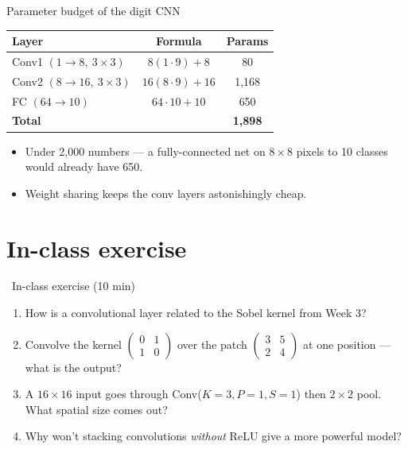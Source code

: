 \documentclass[10pt,aspectratio=169]{beamer}
\begin{document}
\begin{frame}{Parameter budget of the digit CNN}
  \begin{center}
  \begin{tabular}{@{}lcc@{}}
    \toprule
    \textbf{Layer} & \textbf{Formula} & \textbf{Params} \\
    \midrule
    Conv1 $(1{\to}8,\ 3{\times}3)$  & $8(1\cdot9)+8$   & 80 \\
    Conv2 $(8{\to}16,\ 3{\times}3)$ & $16(8\cdot9)+16$ & 1{,}168 \\
    FC $(64{\to}10)$                & $64\cdot10+10$   & 650 \\
    \midrule
    \textbf{Total} & & \textbf{1{,}898} \\
    \bottomrule
  \end{tabular}
  \end{center}
  \begin{itemize}
    \item Under 2{,}000 numbers --- a fully-connected net on $8\times8$ pixels to 10 classes would already have 650.
    \item Weight sharing keeps the conv layers astonishingly cheap.
  \end{itemize}
\end{frame}

\section{In-class exercise}

\begin{frame}{\faPen~In-class exercise (10 min)}
  \begin{infobox}
  \end{infobox}
  \begin{enumerate}
    \item How is a convolutional layer related to the Sobel kernel from Week 3?
    \item Convolve the kernel $\left(\begin{smallmatrix}0&1\\1&0\end{smallmatrix}\right)$ over the patch $\left(\begin{smallmatrix}3&5\\2&4\end{smallmatrix}\right)$ at one position --- what is the output?
    \item A $16\times16$ input goes through Conv($K{=}3, P{=}1, S{=}1$) then $2\times2$ pool. What spatial size comes out?
    \item Why won't stacking convolutions \emph{without} ReLU give a more powerful model?
  \end{enumerate}
\end{frame}
\end{document}
